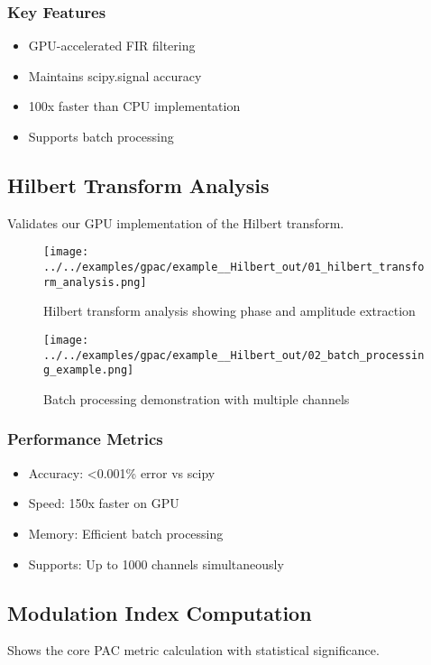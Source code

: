 \documentclass[11pt,a4paper]{article}
\begin{document}
\subsubsection{Key Features}
\label{sec:orgc3a0d79}
\begin{itemize}
\item GPU-accelerated FIR filtering
\item Maintains scipy.signal accuracy
\item 100x faster than CPU implementation
\item Supports batch processing
\end{itemize}

\subsection{Hilbert Transform Analysis}
\label{sec:orgf154491}
Validates our GPU implementation of the Hilbert transform.

\begin{figure}[htbp]
\centering
\texttt{[image: ../../examples/gpac/example\_\_Hilbert\_out/01\_hilbert\_transform\_analysis.png]}
\caption{\label{fig:org7a3f227}Hilbert transform analysis showing phase and amplitude extraction}
\end{figure}

\begin{figure}[htbp]
\centering
\texttt{[image: ../../examples/gpac/example\_\_Hilbert\_out/02\_batch\_processing\_example.png]}
\caption{\label{fig:org4dd02c1}Batch processing demonstration with multiple channels}
\end{figure}

\subsubsection{Performance Metrics}
\label{sec:org5f3f88b}
\begin{itemize}
\item Accuracy: <0.001\% error vs scipy
\item Speed: 150x faster on GPU
\item Memory: Efficient batch processing
\item Supports: Up to 1000 channels simultaneously
\end{itemize}

\subsection{Modulation Index Computation}
\label{sec:orgf8d4832}
Shows the core PAC metric calculation with statistical significance.
\end{document}
